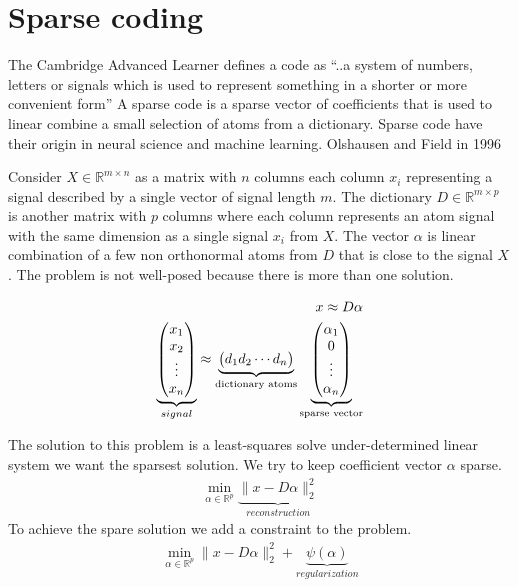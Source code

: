 \chapter{Sparse coding}
\thispagestyle{empty}

The Cambridge Advanced Learner defines a code as ``..a system of numbers, letters or signals which is used to represent something in a shorter or more convenient form''
A sparse code is a sparse vector of coefficients that is used to linear combine a small selection of atoms from a dictionary.
Sparse code have their origin in neural science and machine learning. Olshausen and Field in 1996 \cite{Olshausen1996}

Consider $X \in \mathbb{R}^{m\times n}$  as a matrix with $n$ columns each column $x_{i}$ representing a signal described by a single vector of signal length $m$.
The dictionary $D\in\mathbb{R}^{m \times p}$ is another matrix with $p$ columns where each column represents an atom signal with the same dimension as a single signal $x_{i}$ from $X$.
The vector $\alpha$ is linear combination of a few non orthonormal atoms from $D$ that is close to the signal $X$.
The problem is not well-posed because there is more than one solution. 

\begin{align}
x \approx D\alpha\notag\\
\underbrace{\begin{pmatrix} x_1 \\ x_2 \\ \vdots \\ x_n \end{pmatrix}}_{signal} \approx \underbrace{\begin{pmatrix} d_1  d_2 \cdots d_n \end{pmatrix}}_{\textrm{dictionary atoms}}
\underbrace{\begin{pmatrix} \alpha_1 \\ 0 \\ \vdots \\ \alpha_n \end{pmatrix}}_{\textrm{sparse vector}}
\end{align}

The solution to this problem is a least-squares solve under-determined linear system we want the sparsest solution.
We try to keep coefficient vector $\alpha$ sparse.
\begin{align}
\min_{\alpha\in\mathbb{R}^{p}} \underbrace{\lVert x - D\alpha \rVert^{2}_{2}}_{reconstruction} \label{eq:problem}
\end{align}
To achieve the spare solution we add a constraint to the problem. 
\begin{align}
\min_{\alpha\in\mathbb{R}^{p}} \lVert x - D\alpha \rVert^{2}_{2} + \underbrace{\psi(\alpha)}_{regularization}
\end{align}

